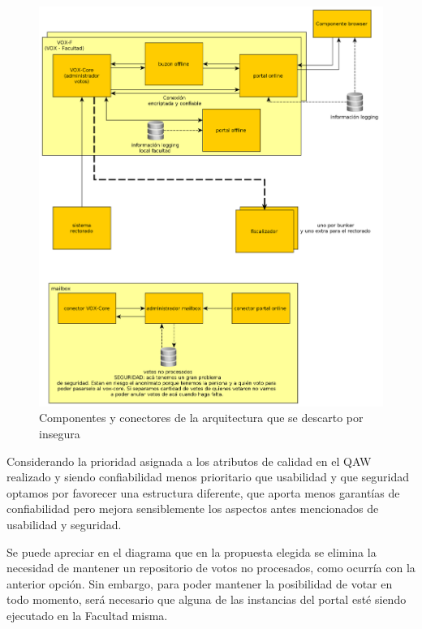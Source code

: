 \begin{figure}[H]
	\begin{center}
		\includegraphics[scale=0.26]{../diagramas/arquitecturaInsegura.png}
		\caption{Componentes y conectores de la arquitectura que se descarto por insegura}
	\end{center} 
\end{figure}

Considerando la prioridad asignada a los atributos de calidad en el QAW realizado y siendo confiabilidad menos prioritario que usabilidad y que seguridad optamos por favorecer una estructura diferente, que aporta menos garantías de confiabilidad pero mejora sensiblemente los aspectos antes mencionados de usabilidad y seguridad.

Se puede apreciar en el diagrama %
que en la propuesta elegida se elimina la necesidad de mantener un repositorio de votos no procesados, como ocurría con la anterior opción. Sin embargo, para poder mantener la posibilidad de votar en todo momento, será necesario que alguna de las instancias del portal esté siendo ejecutado en la Facultad misma. 


